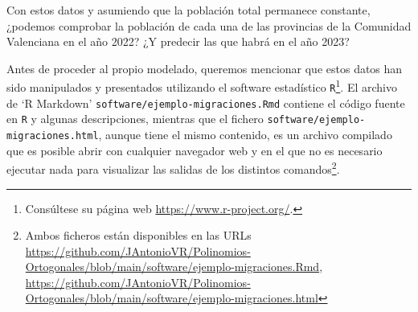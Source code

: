 \begin{ejemplo}
        Con estos datos y asumiendo que la población total permanece constante, ¿podemos comprobar la población de cada una de las provincias de la Comunidad Valenciana en el año 2022? ¿Y predecir las que habrá en el año 2023?

        Antes de proceder al propio modelado, queremos mencionar que estos datos han sido manipulados y presentados utilizando el software estadístico \texttt{R}\footnote{Consúltese su página web \url{https://www.r-project.org/}.}. El archivo de `R Markdown' \texttt{software/ejemplo-migraciones.Rmd} 
        contiene el código fuente en \texttt{R} y algunas descripciones, mientras que el fichero \texttt{software/ejemplo-migraciones.html}, aunque tiene el mismo contenido, es un archivo compilado que es posible abrir con cualquier navegador web y en el que no es necesario ejecutar nada para visualizar las salidas de los distintos comandos\footnote{Ambos ficheros están disponibles en las URLs \url{https://github.com/JAntonioVR/Polinomios-Ortogonales/blob/main/software/ejemplo-migraciones.Rmd}, \url{https://github.com/JAntonioVR/Polinomios-Ortogonales/blob/main/software/ejemplo-migraciones.html}}. 


\end{ejemplo}
